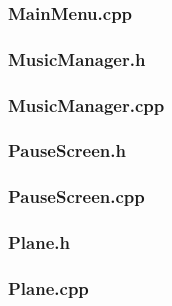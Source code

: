 \documentclass{article}
\begin{document}
\subsubsection{MainMenu.cpp}
		 
 				
\subsubsection{MusicManager.h}
	
	 				
\subsubsection{MusicManager.cpp}
	
	 				
\subsubsection{PauseScreen.h}
	 
	 				
\subsubsection{PauseScreen.cpp}	
	 
	 				
\subsubsection{Plane.h}
	
	 				
\subsubsection{Plane.cpp}
	
	 			
\end{document}
